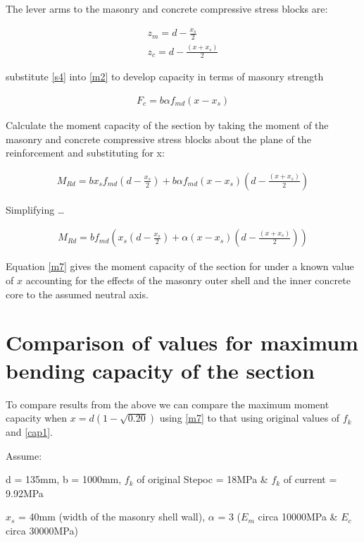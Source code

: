 \documentclass[11pt]{article}
\begin{document}
The lever arms to the masonry and concrete compressive stress blocks
are:

\begin{align}
z_m = d - \frac{x_s}{2}\\
z_c = d - \frac{(x + x_s)}{2}
\end{align}

substitute \ref{s4} into \ref{m2} to develop capacity in terms of
masonry strength

\begin{align}
F_c = b \alpha f_{md} (x-x_s)
\end{align}

Calculate the moment capacity of the section by taking the moment of the
masonry and concrete compressive stress blocks about the plane of the
reinforcement and substituting for x:

\begin{align}
M_{Rd} = b x_s f_{md} (d - \frac{x_s}{2}) + b \alpha f_{md}(x-x_s)(d - \frac{(x + x_s)}{2})
\end{align}

Simplifying \ldots{}

\begin{align}
M_{Rd} = b f_{md} \left(x_s (d - \frac{x_s}{2}) +  \alpha (x-x_s) (d - \frac{(x + x_s)}{2})\right)
\end{align}

Equation \ref{m7} gives the moment capacity of the section for under a
known value of \(x\) accounting for the effects of the masonry outer
shell and the inner concrete core to the assumed neutral axis.

    \hypertarget{comparison-of-values-for-maximum-bending-capacity-of-the-section}{%
\section{Comparison of values for maximum bending capacity of the
section}\label{comparison-of-values-for-maximum-bending-capacity-of-the-section}}

To compare results from the above we can compare the maximum moment
capacity when \(x=d(1-\sqrt{0.20})\) using \ref{m7} to that using
original values of \(f_k\) and \ref{cap1}.

Assume:

d = 135mm, b = 1000mm, \(f_k\) of original Stepoc = 18MPa \& \(f_k\) of
current = 9.92MPa

\(x_s\) = 40mm (width of the masonry shell wall), \(\alpha\) = 3
(\(E_m\) circa 10000MPa \& \(E_c\) circa 30000MPa)
\end{document}
